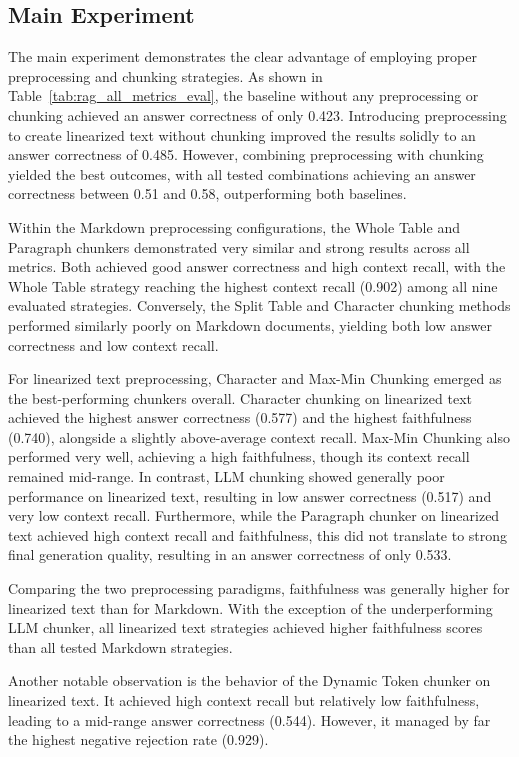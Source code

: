 \documentclass[12pt]{article} %
\begin{document}
\subsection{Main Experiment}
The main experiment demonstrates the clear advantage of employing proper preprocessing and chunking strategies. As shown in Table~\ref{tab:rag_all_metrics_eval}, the baseline without any preprocessing or chunking achieved an answer correctness of only 0.423. Introducing preprocessing to create linearized text without chunking improved the results solidly to an answer correctness of 0.485. However, combining preprocessing with chunking yielded the best outcomes, with all tested combinations achieving an answer correctness between 0.51 and 0.58, outperforming both baselines.

Within the Markdown preprocessing configurations, the Whole Table and Paragraph chunkers demonstrated very similar and strong results across all metrics. Both achieved good answer correctness and high context recall, with the Whole Table strategy reaching the highest context recall (0.902) among all nine evaluated strategies. Conversely, the Split Table and Character chunking methods performed similarly poorly on Markdown documents, yielding both low answer correctness and low context recall.

For linearized text preprocessing, Character and Max-Min Chunking emerged as the best-performing chunkers overall. Character chunking on linearized text achieved the highest answer correctness (0.577) and the highest faithfulness (0.740), alongside a slightly above-average context recall. Max-Min Chunking also performed very well, achieving a high faithfulness, though its context recall remained mid-range. In contrast, LLM chunking showed generally poor performance on linearized text, resulting in low answer correctness (0.517) and very low context recall. Furthermore, while the Paragraph chunker on linearized text achieved high context recall and faithfulness, this did not translate to strong final generation quality, resulting in an answer correctness of only 0.533.

Comparing the two preprocessing paradigms, faithfulness was generally higher for linearized text than for Markdown. With the exception of the underperforming LLM chunker, all linearized text strategies achieved higher faithfulness scores than all tested Markdown strategies.

Another notable observation is the behavior of the Dynamic Token chunker on linearized text. It achieved high context recall but relatively low faithfulness, leading to a mid-range answer correctness (0.544). However, it managed by far the highest negative rejection rate (0.929).
\end{document}
